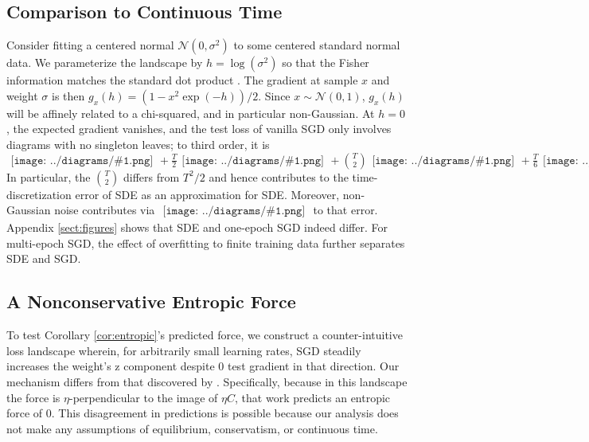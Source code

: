 \documentclass{article}
\theoremstyle{plain}
\theoremstyle{definition}
\newcommand{\Nn}{\mathcal{N}}
\newcommand{\sdia}[1]{\begin{gathered}\texttt{[image: ../diagrams/\#1.png]}\end{gathered}}
\begin{document}
    \subsection{Comparison to Continuous Time}
        Consider fitting a centered normal $\Nn(0, \sigma^2)$ to some centered
        standard normal data.  We parameterize the landscape by
        $h=\log(\sigma^2)$ so that the Fisher information matches the standard
        dot product \citep{am98}.  The gradient at sample $x$ and weight
        $\sigma$ is then $g_x(h) = (1-x^2\exp(-h))/2$.  Since $x\sim \Nn(0,
        1)$, $g_x(h)$ will be affinely related to a chi-squared, and in
        particular non-Gaussian.  At $h=0$, the expected gradient vanishes, and
        the test loss of vanilla SGD only involves diagrams with no singleton
        leaves; to third order, it is
        $
            \sdia{(0)()}
            +\frac{T}{2} \sdia{c(01-2)(02-12)}
            +{T\choose 2} \sdia{c(03-1-2)(01-12-23)}
            +\frac{T}{6} \sdia{c(012-3)(03-13-23)}
        $
        In particular, the ${T\choose 2}$ differs from $T^2/2$ and hence
        contributes to the time-discretization error of SDE as an approximation
        for SDE.  Moreover, non-Gaussian noise contributes via
        $\sdia{c(012-3)(03-13-23)}$ to that error.  Appendix \ref{sect:figures}
        shows that SDE and one-epoch SGD indeed differ.  For multi-epoch
        SGD, the effect of overfitting to finite training data further
        separates SDE and SGD.


    \subsection{A Nonconservative Entropic Force} \label{subsect:entropic}
        To test Corollary \ref{cor:entropic}'s predicted force, 
        we construct a counter-intuitive loss landscape wherein, for
        arbitrarily small learning rates, SGD steadily increases the weight's
        z component despite 0 test gradient in that direction.
        Our mechanism differs from that discovered by \citet{ch18}.
        Specifically, because in this landscape the force is
        $\eta$-perpendicular to the image of $\eta C$, that work predicts an
        entropic force of $0$.  This disagreement in predictions is possible
        because our analysis does not make any assumptions of equilibrium,
        conservatism, or continuous time.
\end{document}

